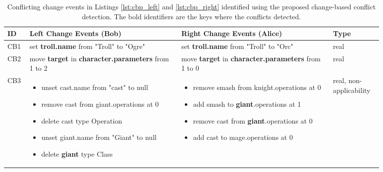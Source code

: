 \begin{table*}[ht]
  \centering
  \caption{Conflicting change events in Listings \ref{lst:cbp_left} and \ref{lst:cbp_right} identified using the proposed change-based conflict detection. The bold identifiers are the keys where the conflicts detected.}
  \label{table:conflicts_cbp}
  \begin{scriptsize}
  \begin{tabular}{|p{0.04\linewidth}|p{0.365\linewidth}|p{0.365\linewidth}|
      p{0.11\linewidth}|}
    \hline
    \textbf{ID} & 
    \textbf{Left Change Events (Bob)} & 
    \textbf{Right Change Events (Alice)} & 
    \textbf{Type}\\ 
    \hline
    CB1 & 
    set \textbf{troll.name} from "Troll" to "Ogre" & 
    set \textbf{troll.name} from "Troll" to "Orc" & 
    real \\
    \hline
    CB2 & move \textbf{target} in \textbf{character.parameters} from 1 to 2 & 
    move \textbf{target} in \textbf{character.parameters} from 1 to 0 & 
    real \\ 
    \hline
    CB3 & 
    \begin{minipage}[t]{\linewidth}
      \raggedright
      \begin{itemize}[leftmargin=0pt]
        \setlength
        \item[] unset cast.name from "cast" to null
        \item[] remove cast from giant.operations at 0
        \item[] delete cast type Operation
        \item[] unset giant.name from "Giant" to null
        \item[] delete \textbf{giant} type Class
      \end{itemize}
    \end{minipage}
    & 
    \begin{minipage}[t]{\linewidth}
      \raggedright
      \begin{itemize}[leftmargin=0pt]
        \setlength
        \item[] remove smash from knight.operations at 0
        \item[] add smash to \textbf{giant}.operations at 1
        \item[] remove cast from \textbf{giant}.operations at 0
        \item[] add cast to mage.operations at 0
      \end{itemize}
    \end{minipage}
    & 
    real, non-applicability\\

\end{tabular}
\end{scriptsize}
\end{table*}
